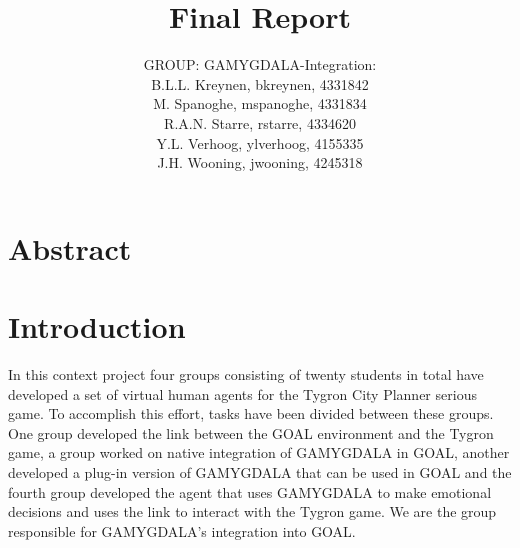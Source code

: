 \documentclass[11pt]{article}
\title{Final Report}
\author{GROUP: GAMYGDALA-Integration:\\
	B.L.L. Kreynen, bkreynen, 4331842\\
	M. Spanoghe, mspanoghe, 4331834\\
	R.A.N. Starre, rstarre, 4334620\\
	Y.L. Verhoog, ylverhoog, 4155335\\
	J.H. Wooning, jwooning, 4245318\\
}
\begin{document}
\maketitle
\pagebreak
\tableofcontents
\pagebreak
\section{Abstract}

\clearpage

\section{Introduction}
In this context project four groups consisting of twenty students in total have developed a set of virtual human agents for the Tygron City Planner serious game. To accomplish this effort, tasks have been divided between these groups. One group developed the link between the GOAL\cite{GOAL} environment and the Tygron game, a group worked on native integration of \gls{GAMYGDALA}\cite{GAMYGDALA} in GOAL, another developed a plug-in version of GAMYGDALA that can be used in GOAL and the fourth group developed the agent that uses GAMYGDALA to make emotional decisions and uses the link to interact with the Tygron game. We are the group responsible for GAMYGDALA's integration into GOAL. 
\end{document}
